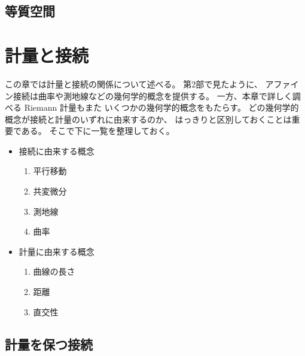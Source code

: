 \documentclass[report]{jlreq}
\begin{document}
%
\section{等質空間}

\TODO{}



%
\chapter{計量と接続}

この章では計量と接続の関係について述べる。
第2部で見たように、
アファイン接続は曲率や測地線などの幾何学的概念を提供する。
一方、本章で詳しく調べる Riemann 計量もまた
いくつかの幾何学的概念をもたらす。
どの幾何学的概念が接続と計量のいずれに由来するのか、
はっきりと区別しておくことは重要である。
そこで下に一覧を整理しておく。

\begin{itemize}
    \item 接続に由来する概念
        \begin{enumerate}
            \item 平行移動
            \item 共変微分
            \item 測地線
            \item 曲率
        \end{enumerate}
    \item 計量に由来する概念
        \begin{enumerate}
            \item 曲線の長さ
            \item 距離
            \item 直交性
        \end{enumerate}
\end{itemize}

%
\section{計量を保つ接続}

\end{document}
